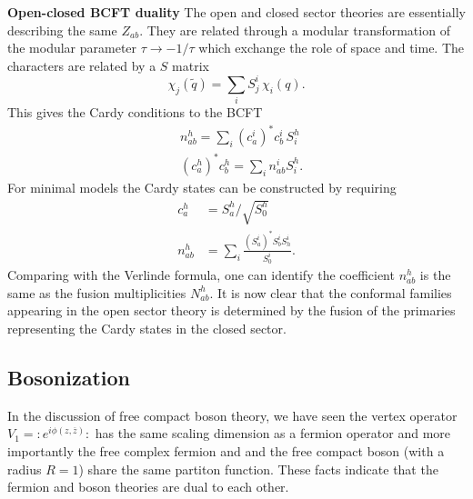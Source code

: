 \documentclass[submission, PhysLectNotes]{SciPost}
\begin{document}
{\bf Open-closed BCFT duality}
The open and closed sector theories are essentially describing the same $Z_{ab}$. They are related through a modular transformation of the modular parameter $\tau \rightarrow -1/\tau$ which exchange the role of space and time. The characters are related by a $S$ matrix 
\begin{equation}
    \chi_j(\tilde{q}) = \sum_i S^i_j\, \chi_i(q).
\end{equation}
This gives the Cardy conditions to the BCFT
\begin{equation}
\begin{split}
    & n_{ab}^h = \sum_i {\left(c_a^i\right)}^* c_b^i\, S_i^h \\
    & {\left(c_a^h\right)}^* c_b^h = \sum_i n_{ab}^i S^h_i.  
\end{split}
\end{equation}
For minimal models the Cardy states can be constructed by requiring
\begin{equation}
\begin{split}
    c_a^h &= S_a^h / \sqrt{S^h_0} \\
    n_{ab}^h &= \sum_i \frac{{\left(S_a^i\right)}^* S_b^i S_h^i}{S_0^i}.
\end{split}
\end{equation}
Comparing with the Verlinde formula, one can identify the coefficient $n_{ab}^h$ is the same as the fusion multiplicities $N_{ab}^h$. It is now clear that the conformal families appearing in the open sector theory is determined by the fusion of the primaries representing the Cardy states in the closed sector. 

\subsection{Bosonization}
In the discussion of free compact boson theory, we have seen the vertex operator $V_1 = \mathop{:}e^{i\phi(z,\overline{z})}\mathop{:}$ has the same scaling dimension as a fermion operator and more importantly the free complex fermion and and the free compact boson (with a radius $R=1$) share the same partiton function. These facts indicate that the fermion and boson theories are dual to each other. 
\end{document}
